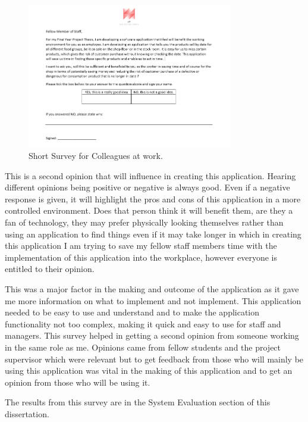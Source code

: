 \begin{figure}[h!]
	\caption{Short Survey for Colleagues at work.}
	\label{image:survey}
	\centering
	\includegraphics[width=0.8\textwidth]{images/AF-Date-Control-Survey.PNG}
\end{figure}

This is a second opinion that will influence in creating this application. Hearing different opinions being positive or negative is always good. Even if a negative response is given, it will highlight the pros and cons of this application in a more controlled environment. Does that person think it will benefit them, are they a fan of technology, they may prefer physically looking themselves rather than using an application to find things even if it may take longer in which in creating this application I am trying to save my fellow staff members time with the implementation of this application into the workplace, however everyone is entitled to their opinion. 
\newline

This was a major factor in the making and outcome of the application as it gave me more information on what to implement and not implement. This application needed to be easy to use and understand and to make the application functionality not too complex, making it quick and easy to use for staff and managers. This survey helped in getting a second opinion from someone working in the same role as me. Opinions came from fellow students and the project supervisor which were relevant but to get feedback from those who will mainly be using this application was vital in the making of this application and to get an opinion from those who will be using it.
\newline

The results from this survey are in the System Evaluation section of this dissertation. 

